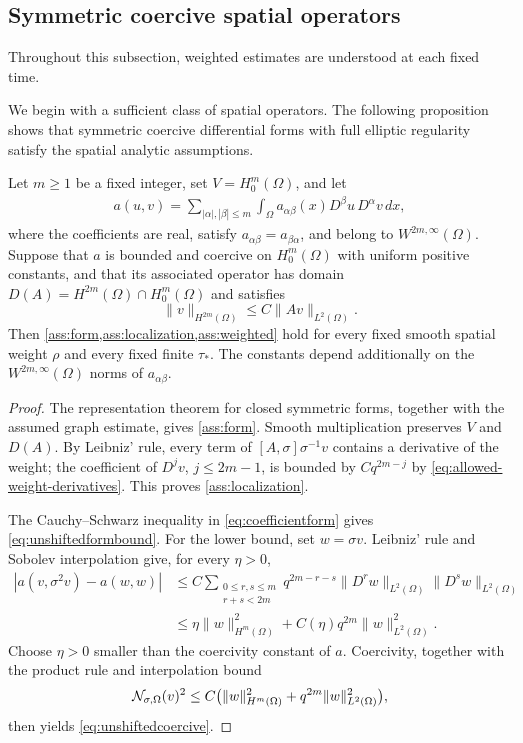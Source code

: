 \documentclass[print,wide,eng]{draft}
\begin{document}
\subsection{Symmetric coercive spatial operators}

Throughout this subsection, weighted estimates are understood at each fixed time.

We begin with a sufficient class of spatial operators. The following proposition shows that symmetric coercive differential forms with full elliptic regularity satisfy the spatial analytic assumptions.
%
\begin{proposition}\label{prop:spatial-operators}
Let $m\ge1$ be a fixed integer, set $V=H_0^m(\Omega)$, and let
%
\begin{align}\label{eq:coefficientform}
a(u,v)=\sum_{|\alpha|,|\beta|\le m}
\int_\Omega a_{\alpha\beta}(x)D^\beta u\,D^\alpha v\,dx,
\end{align}
%
where the coefficients are real, satisfy $a_{\alpha\beta}=a_{\beta\alpha}$, and belong to $W^{2m,\infty}(\Omega)$. Suppose that $a$ is bounded and coercive on $H_0^m(\Omega)$ with uniform positive constants, and that its associated operator has domain $D(A)=H^{2m}(\Omega)\cap H_0^m(\Omega)$ and satisfies\vspace{-2mm}
%
$$
\|v\|_{H^{2m}(\Omega)}\le C\|Av\|_{L^2(\Omega)}.
$$
%
Then \cref{ass:form,ass:localization,ass:weighted} hold for every fixed smooth spatial weight $\rho$ and every fixed finite $\tau_*$. The constants depend additionally on the $W^{2m,\infty}(\Omega)$ norms of $a_{\alpha\beta}$.
\end{proposition}
%
\begin{proof}
The representation theorem for closed symmetric forms, together with the assumed graph estimate, gives \cref{ass:form}. Smooth multiplication preserves $V$ and $D(A)$. By Leibniz' rule, every term of $[A,\sigma]\sigma^{-1}v$ contains a derivative of the weight; the coefficient of $D^jv$, $j\leq2m-1$, is bounded by $Cq^{2m-j}$ by \cref{eq:allowed-weight-derivatives}. This proves \cref{ass:localization}.

The Cauchy--Schwarz inequality in \cref{eq:coefficientform} gives \cref{eq:unshiftedformbound}. For the lower bound, set $w=\sigma v$. Leibniz' rule and Sobolev interpolation give, for every $\eta>0$,\vspace{-2mm}
%
\begin{align*}
|a(v,\sigma^2v)-a(w,w)|
&\leq C\sum_{\substack{0\leq r,s\leq m\\r+s<2m}}
q^{2m-r-s}\|D^rw\|_{L^2(\Omega)}\|D^sw\|_{L^2(\Omega)}\\
&\leq\eta\|w\|_{H^m(\Omega)}^2+C(\eta)q^{2m}\|w\|_{L^2(\Omega)}^2.
\end{align*}
%
Choose $\eta>0$ smaller than the coercivity constant of $a$. Coercivity, together with the product rule and interpolation bound\vspace{-2mm}
%
$$
\mathcal N_{\sigma,\Omega}(v)^2
\leq C\bigl(\|w\|_{H^m(\Omega)}^2+q^{2m}\|w\|_{L^2(\Omega)}^2\bigr),\vspace{-2mm}
$$
%
then yields \cref{eq:unshiftedcoercive}.
\end{proof}
%
\end{document}
